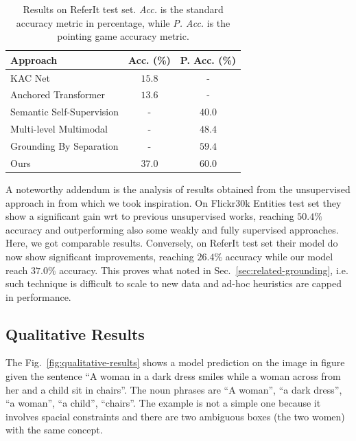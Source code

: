 \begin{table}
  \centering
  \begin{tabular}{lcc}
    \toprule
    Approach & Acc. (\%) & P. Acc. (\%) \\
    \midrule
    KAC Net \cite{chen2018knowledge}                         & $15.8$ & -      \\
    Anchored Transformer \cite{zhao2018weakly}               & $13.6$ & -      \\
    Semantic Self-Supervision \cite{javed2018learning}       & -      & $40.0$ \\
    Multi-level Multimodal \cite{akbari2019multi}            & -      & $48.4$ \\
    Grounding By Separation \cite{arbelle2021detector}       & -      & $59.4$ \\
    \midrule
    Ours                                                     & $\bm{37.0}$ & $60.0$ \\
    \bottomrule
  \end{tabular}
  \caption[Results on ReferIt test set]{Results on
  ReferIt test set. \textit{Acc.} is the standard accuracy
  metric in percentage, while \textit{P. Acc.} is the pointing game
  accuracy metric.}
  \label{tab:results-referit}
\end{table}

A noteworthy addendum is the analysis of results obtained from the
unsupervised approach in \cite{wang2019phrase} from which we took
inspiration. On Flickr30k Entities test set they show a significant
gain wrt to previous unsupervised works, reaching $50.4\%$ accuracy
and outperforming also some weakly and fully supervised approaches.
Here, we got comparable results. Conversely, on ReferIt test set their
model do now show significant improvements, reaching $26.4\%$ accuracy
while our model reach $37.0\%$ accuracy. This proves what noted in
Sec.~\ref{sec:related-grounding}, i.e. such technique is difficult to
scale to new data and ad-hoc heuristics are capped in performance.

\subsection{Qualitative Results}

The Fig.~\ref{fig:qualitative-results} shows a model prediction on the
image in figure given the sentence ``A woman in a dark dress smiles
while a woman across from her and a child sit in chairs''. The noun
phrases are ``A woman'', ``a dark dress'', ``a woman'', ``a child'',
``chairs''. The example is not a simple one because it involves
spacial constraints and there are two ambiguous boxes (the two women)
with the same concept. 

